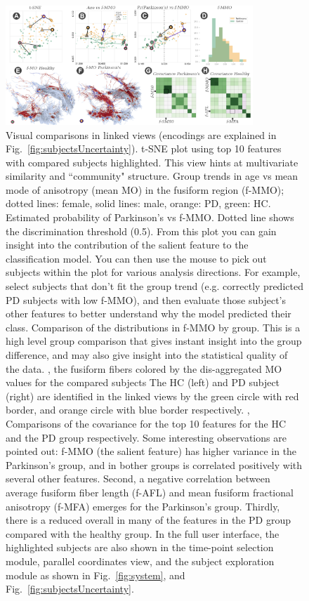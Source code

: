 \begin{figure}[t]
\centering
\includegraphics[width=0.83\textwidth]{images/comparisonV3labeled.png}
\caption{Visual comparisons in linked views (encodings are explained in Fig.~\ref{fig:subjectsUncertainty}).  t-SNE plot using top 10 features with compared subjects highlighted. This view hints at multivariate similarity and ``community" structure.
 Group trends in age vs mean mode of anisotropy (mean MO) in the fusiform region (f-MMO); dotted lines: female, solid lines: male, orange: PD, green: HC.  Estimated probability of Parkinson's vs f-MMO. Dotted line shows the discrimination threshold (0.5). From this plot you can gain insight into the contribution of the salient feature to the classification model. You can then use the mouse to pick out subjects within the plot for various analysis directions. For example, select subjects that don't fit the group trend (e.g. correctly predicted PD subjects with low f-MMO), and then evaluate those subject's other features to better understand why the model predicted their class.  Comparison of the distributions in f-MMO by group. This is a high level group comparison that gives instant insight into the group difference, and may also give insight into the statistical quality of the data. , the fusiform fibers colored by the dis-aggregated MO values for the compared subjects The HC (left) and PD subject (right) are identified in the linked views by the green circle with red border, and orange circle with blue border respectively. , Comparisons of the covariance for the top 10 features for the HC and the PD group respectively. Some interesting observations are pointed out: f-MMO (the salient feature) has higher variance in the Parkinson's group, and in bother groups is correlated positively with several other features. Second, a negative correlation between average fusiform fiber length (f-AFL) and mean fusiform fractional anisotropy (f-MFA) emerges for the Parkinson's group. Thirdly, there is a reduced overall in many of the features in the PD group compared with the healthy group. In the full user interface, the highlighted subjects are also shown in the time-point selection module, parallel coordinates view, and the subject exploration module as shown in Fig.~\ref{fig:system}, and Fig.~\ref{fig:subjectsUncertainty}.}
\label{fig:infovis}
\end{figure}


